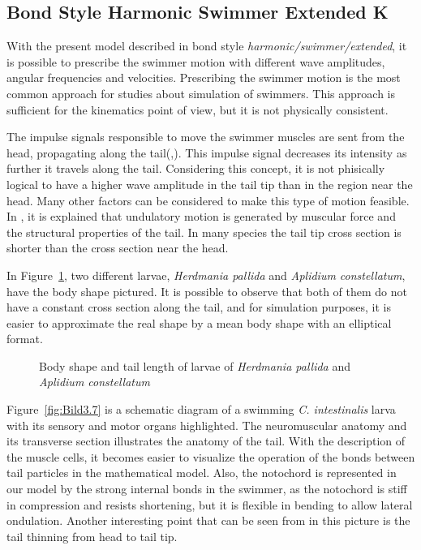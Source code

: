 \subsection{Bond Style Harmonic Swimmer Extended K}
\label{sec:section 2}

With the present model described in bond style \textit{harmonic/swimmer/extended}, it is possible to prescribe the swimmer motion with different wave amplitudes, angular frequencies
and velocities. Prescribing the swimmer motion is the most common approach for studies about simulation of swimmers. This approach is sufficient for the kinematics point of view,
but it is not physically consistent.\par
The impulse signals responsible to move the swimmer muscles are sent from the head, propagating along the tail(\cite{jayne_muscular_1988},\cite{gillis_neuromuscular_1998}). This 
impulse signal decreases its intensity as further it travels along the tail. Considering this concept, it is not phisically logical to have a higher wave amplitude in the tail tip
than in the region near the head. Many other factors can be considered to make this type of motion feasible. In \cite{mchenry_morphology_2005}, it is explained that undulatory 
motion is generated by muscular force and the structural properties of the tail. In many species the tail tip cross section is shorter than the cross section near the head.\par
In Figure~\ref{fig:Bild3.6}, two different larvae, \textit{Herdmania pallida} and \textit{Aplidium constellatum}, have the body shape pictured. It is possible to observe that 
both of them do not have a constant cross section along the tail, and for simulation purposes, it is easier to approximate the real shape by a mean body shape with an elliptical
format. 



\begin{figure}[H]
\centering
  \begin{footnotesize}
  
  \caption[Body shape and tail length of larvae of \textit{Herdmania pallida} and \textit{Aplidium constellatum}\cite{mchenry_morphology_2005}]{Body shape and tail length of larvae of \textit{Herdmania pallida} and \textit{Aplidium constellatum}\cite{mchenry_morphology_2005}}
  \label{fig:Bild3.6}
  \end{footnotesize}
\end{figure} 

Figure~\ref{fig:Bild3.7} is a schematic diagram of a swimming \textit{C. intestinalis} larva with its sensory and motor organs highlighted. The neuromuscular anatomy and its 
transverse section illustrates the anatomy of the tail. With the description of the muscle cells, it becomes easier to visualize the operation of the bonds between tail particles
in the mathematical model. Also, the notochord is represented in our model by the strong internal bonds in the swimmer, as the notochord is stiff in compression and resists shortening,
but it is flexible in bending to allow lateral ondulation. Another interesting point that can be seen from in this picture is the tail  thinning from head to tail tip.


